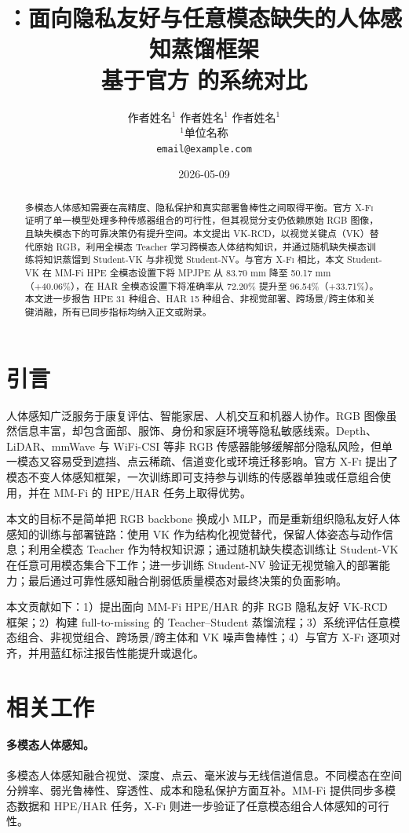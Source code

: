 \documentclass[UTF8,10pt,a4paper]{ctexart}
\title{\vspace{-1.8em}\textbf{\method{}：面向隐私友好与任意模态缺失的人体感知蒸馏框架}\\[-0.2em]\large 基于官方 \xfi{} 的系统对比}
\author{作者姓名$^1$ \quad 作者姓名$^1$ \quad 作者姓名$^1$\\$^1$单位名称\\\texttt{email@example.com}}
\date{2026-05-09}
\newcommand{\better}[1]{\textcolor{ImpBlue}{#1}}
\newcommand{\method}{VK-RCD}
\newcommand{\xfi}{\textsc{X-Fi}}
\newcommand{\dataset}{MM-Fi}
\begin{document}
\maketitle
\vspace{-1.0em}
\begin{abstract}
多模态人体感知需要在高精度、隐私保护和真实部署鲁棒性之间取得平衡。官方 \xfi{} 证明了单一模型处理多种传感器组合的可行性，但其视觉分支仍依赖原始 RGB 图像，且缺失模态下的可靠决策仍有提升空间。本文提出 \method{}，以视觉关键点（VK）替代原始 RGB，利用全模态 Teacher 学习跨模态人体结构知识，并通过随机缺失模态训练将知识蒸馏到 Student-VK 与非视觉 Student-NV。与官方 \xfi{} 相比，本文 Student-VK 在 \dataset{} HPE 全模态设置下将 MPJPE 从 83.70 mm 降至 50.17 mm（\better{+40.06\%}），在 HAR 全模态设置下将准确率从 72.20\% 提升至 96.54\%（\better{+33.71\%}）。本文进一步报告 HPE 31 种组合、HAR 15 种组合、非视觉部署、跨场景/跨主体和关键消融，所有已同步指标均纳入正文或附录。
\end{abstract}

\section{引言}
人体感知广泛服务于康复评估、智能家居、人机交互和机器人协作。RGB 图像虽然信息丰富，却包含面部、服饰、身份和家庭环境等隐私敏感线索。Depth、LiDAR、mmWave 与 WiFi-CSI 等非 RGB 传感器能够缓解部分隐私风险，但单一模态又容易受到遮挡、点云稀疏、信道变化或环境迁移影响。官方 \xfi{} 提出了模态不变人体感知框架，一次训练即可支持参与训练的传感器单独或任意组合使用，并在 MM-Fi 的 HPE/HAR 任务上取得优势。

本文的目标不是简单把 RGB backbone 换成小 MLP，而是重新组织隐私友好人体感知的训练与部署链路：使用 VK 作为结构化视觉替代，保留人体姿态与动作信息；利用全模态 Teacher 作为特权知识源；通过随机缺失模态训练让 Student-VK 在任意可用模态集合下工作；进一步训练 Student-NV 验证无视觉输入的部署能力；最后通过可靠性感知融合削弱低质量模态对最终决策的负面影响。

本文贡献如下：1）提出面向 MM-Fi HPE/HAR 的非 RGB 隐私友好 VK-RCD 框架；2）构建 full-to-missing 的 Teacher--Student 蒸馏流程；3）系统评估任意模态组合、非视觉组合、跨场景/跨主体和 VK 噪声鲁棒性；4）与官方 \xfi{} 逐项对齐，并用蓝红标注报告性能提升或退化。

\section{相关工作}
\paragraph{多模态人体感知。}
多模态人体感知融合视觉、深度、点云、毫米波与无线信道信息。不同模态在空间分辨率、弱光鲁棒性、穿透性、成本和隐私保护方面互补。MM-Fi 提供同步多模态数据和 HPE/HAR 任务，\xfi{} 则进一步验证了任意模态组合人体感知的可行性。
\end{document}
